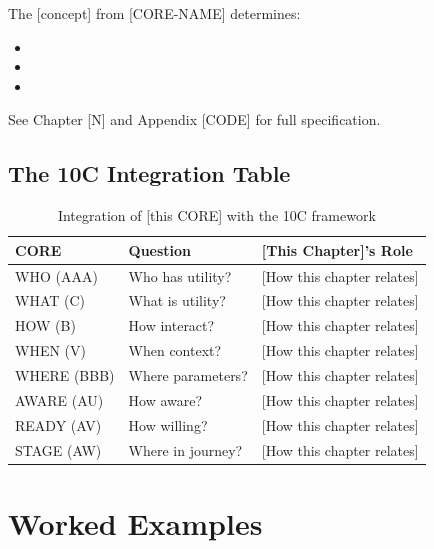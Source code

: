 \begin{cross-reference}
The [concept] from [CORE-NAME] determines:
\begin{itemize}
    \item [Connection 1]
    \item [Connection 2]
    \item [Connection 3]
\end{itemize}
See Chapter [N] and Appendix [CODE] for full specification.
\end{cross-reference}

\subsection{The 10C Integration Table}

\begin{table}[h]
\centering
\begin{tabular}{lll}
\toprule
\textbf{CORE} & \textbf{Question} & \textbf{[This Chapter]'s Role} \\
\midrule
WHO (AAA) & Who has utility? & [How this chapter relates] \\
WHAT (C) & What is utility? & [How this chapter relates] \\
HOW (B) & How interact? & [How this chapter relates] \\
WHEN (V) & When context? & [How this chapter relates] \\
WHERE (BBB) & Where parameters? & [How this chapter relates] \\
AWARE (AU) & How aware? & [How this chapter relates] \\
READY (AV) & How willing? & [How this chapter relates] \\
STAGE (AW) & Where in journey? & [How this chapter relates] \\
\bottomrule
\end{tabular}
\caption{Integration of [this CORE] with the 10C framework}
\label{tab:10c-integration}
\end{table}



\section{Worked Examples}
\label{sec:[label]-applications}

